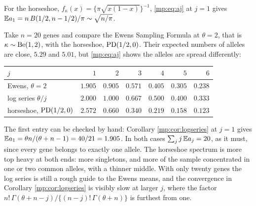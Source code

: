 \begin{corollary}
\label{mp:cor:singleton}
For the horseshoe, $f_\kappa(x)=\{\pi\sqrt{x(1-x)}\}^{-1}$, \eqref{mp:eq:aj} at $j=1$ gives
$\mathbb{E} a_1=n\,B(1/2,n-1/2)/\pi\sim\sqrt{n/\pi}$.
\end{corollary}

\begin{example}
\label{mp:ex:spectra}
Take $n=20$ genes and compare the Ewens Sampling Formula at $\theta=2$, that is
$\kappa\sim\mathrm{Be}(1,2)$, with the horseshoe, $\mathrm{PD}(1/2,0)$. Their expected numbers of alleles are
close, $5.29$ and $5.01$, but \eqref{mp:eq:aj} shows the alleles are spread differently:
\begin{center}
\begin{tabular}{lrrrrrr}
\toprule
$j$ & $1$ & $2$ & $3$ & $4$ & $5$ & $6$ \\
\midrule
Ewens, $\theta=2$ & $1.905$ & $0.905$ & $0.571$ & $0.405$ & $0.305$ & $0.238$ \\
log series $\theta/j$ & $2.000$ & $1.000$ & $0.667$ & $0.500$ & $0.400$ & $0.333$ \\
horseshoe, $\mathrm{PD}(1/2,0)$ & $2.572$ & $0.660$ & $0.340$ & $0.219$ & $0.158$ & $0.123$ \\
\bottomrule
\end{tabular}
\end{center}
The first entry can be checked by hand: Corollary \ref{mp:cor:logseries} at $j=1$ gives
$\mathbb{E} a_1=\theta n/(\theta+n-1)=40/21=1.905$. In both cases $\sum_jj\,\mathbb{E} a_j=20$, as it must,
since every gene belongs to exactly one allele. The horseshoe spectrum is more top heavy
at both ends: more singletons, and more of the sample concentrated in one or two common
alleles, with a thinner middle. With only twenty genes the log series is still a rough
guide to the Ewens means, and the convergence in Corollary \ref{mp:cor:logseries} is visibly
slow at larger $j$, where the factor $n!\,\Gamma(\theta+n-j)/\{(n-j)!\,\Gamma(\theta+n)\}$
is furthest from one.
\end{example}

